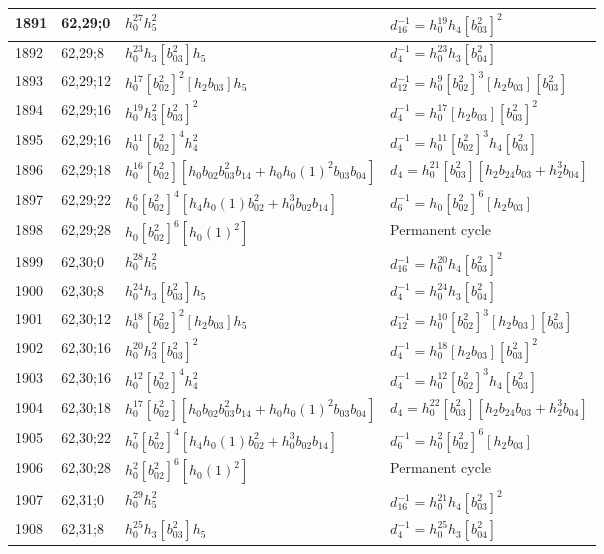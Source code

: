 \documentclass{article}
\begin{document}
\begin{longtable}{|l|l|>{\raggedright\arraybackslash}p{6cm}|>{\raggedright\arraybackslash}p{6cm}|}
\hline
1891 & 62,29;0 & $h_0^{27}h_5^2$ & $d_{16}^{-1}=h_0^{19}h_4[b_{03}^2]^2$\\
\hline
1892 & 62,29;8 & $h_0^{23}h_3[b_{03}^2]h_5$ & $d_{4}^{-1}=h_0^{23}h_3[b_{04}^2]$\\
\hline
1893 & 62,29;12 & $h_0^{17}[b_{02}^2]^2[h_2b_{03}]h_5$ & $d_{12}^{-1}=h_0^9[b_{02}^2]^3[h_2b_{03}][b_{03}^2]$\\
\hline
1894 & 62,29;16 & $h_0^{19}h_3^2[b_{03}^2]^2$ & $d_{4}^{-1}=h_0^{17}[h_2b_{03}][b_{03}^2]^2$\\
1895 & 62,29;16 & $h_0^{11}[b_{02}^2]^4h_4^2$ & $d_{4}^{-1}=h_0^{11}[b_{02}^2]^3h_4[b_{03}^2]$\\
\hline
1896 & 62,29;18 & $h_0^{16}[b_{02}^2][h_0b_{02}b_{03}^2b_{14} + h_0h_0(1)^2b_{03}b_{04}]$ &$d_{4}=h_0^{21}[b_{03}^2][h_2b_{24}b_{03} + h_2^3b_{04}]$\\
\hline
1897 & 62,29;22 & $h_0^6[b_{02}^2]^4[h_4h_0(1)b_{02}^2 + h_0^3b_{02}b_{14}]$ & $d_{6}^{-1}=h_0[b_{02}^2]^6[h_2b_{03}]$\\
\hline
1898 & 62,29;28 & $h_0[b_{02}^2]^6[h_0(1)^2]$ & Permanent cycle\\
\hline
1899 & 62,30;0 & $h_0^{28}h_5^2$ & $d_{16}^{-1}=h_0^{20}h_4[b_{03}^2]^2$\\
\hline
1900 & 62,30;8 & $h_0^{24}h_3[b_{03}^2]h_5$ & $d_{4}^{-1}=h_0^{24}h_3[b_{04}^2]$\\
\hline
1901 & 62,30;12 & $h_0^{18}[b_{02}^2]^2[h_2b_{03}]h_5$ & $d_{12}^{-1}=h_0^{10}[b_{02}^2]^3[h_2b_{03}][b_{03}^2]$\\
\hline
1902 & 62,30;16 & $h_0^{20}h_3^2[b_{03}^2]^2$ & $d_{4}^{-1}=h_0^{18}[h_2b_{03}][b_{03}^2]^2$\\
1903 & 62,30;16 & $h_0^{12}[b_{02}^2]^4h_4^2$ & $d_{4}^{-1}=h_0^{12}[b_{02}^2]^3h_4[b_{03}^2]$\\
\hline
1904 & 62,30;18 & $h_0^{17}[b_{02}^2][h_0b_{02}b_{03}^2b_{14} + h_0h_0(1)^2b_{03}b_{04}]$ &$d_{4}=h_0^{22}[b_{03}^2][h_2b_{24}b_{03} + h_2^3b_{04}]$\\
\hline
1905 & 62,30;22 & $h_0^7[b_{02}^2]^4[h_4h_0(1)b_{02}^2 + h_0^3b_{02}b_{14}]$ & $d_{6}^{-1}=h_0^2[b_{02}^2]^6[h_2b_{03}]$\\
\hline
1906 & 62,30;28 & $h_0^2[b_{02}^2]^6[h_0(1)^2]$ & Permanent cycle\\
\hline
1907 & 62,31;0 & $h_0^{29}h_5^2$ & $d_{16}^{-1}=h_0^{21}h_4[b_{03}^2]^2$\\
\hline
1908 & 62,31;8 & $h_0^{25}h_3[b_{03}^2]h_5$ & $d_{4}^{-1}=h_0^{25}h_3[b_{04}^2]$\\
\hline

\end{longtable}
\end{document}
